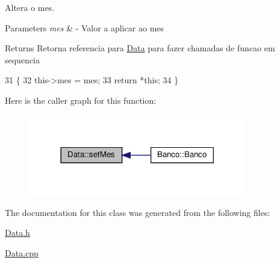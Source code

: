 Altera o mes. 


\begin{DoxyParams}{Parameters}
{\em mes} & -\/ Valor a aplicar ao mes \\
\hline
\end{DoxyParams}
\begin{DoxyReturn}{Returns}
Retorna referencia para \hyperlink{classData}{Data} para fazer chamadas de funcao em sequencia 
\end{DoxyReturn}

\begin{DoxyCode}
31                                           \{
32     this->mes = mes;
33     \textcolor{keywordflow}{return} *\textcolor{keyword}{this};
34 \}
\end{DoxyCode}
Here is the caller graph for this function\+:
\nopagebreak
\begin{figure}[H]
\begin{center}
\leavevmode
\includegraphics[width=270pt]{classData_ab15051ae481d89d057b22abc8152584c_icgraph}
\end{center}
\end{figure}


The documentation for this class was generated from the following files\+:\begin{DoxyCompactItemize}
\item 
\hyperlink{Data_8h}{Data.\+h}\item 
\hyperlink{Data_8cpp}{Data.\+cpp}\end{DoxyCompactItemize}
